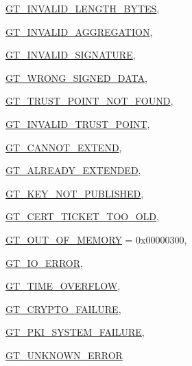\begin{DoxyCompactItemize}
\hyperlink{group__common_gga43b0c0f44bcf02caf0c2866b1f647a35a24646a453a06ef1ed86d0759b67e1d3b}{GT\_\-INVALID\_\-LENGTH\_\-BYTES}, 
\par
\hyperlink{group__common_gga43b0c0f44bcf02caf0c2866b1f647a35a90efaf44bf00c048dd3538275a51336b}{GT\_\-INVALID\_\-AGGREGATION}, 
\par
\hyperlink{group__common_gga43b0c0f44bcf02caf0c2866b1f647a35a7f5a3f747a5125746aea2ce58cd2a41f}{GT\_\-INVALID\_\-SIGNATURE}, 
\par
\hyperlink{group__common_gga43b0c0f44bcf02caf0c2866b1f647a35a7de160cd71ff92d4f28328adce57b170}{GT\_\-WRONG\_\-SIGNED\_\-DATA}, 
\par
\hyperlink{group__common_gga43b0c0f44bcf02caf0c2866b1f647a35a6467d3a62f48b44ff67d3850454a4945}{GT\_\-TRUST\_\-POINT\_\-NOT\_\-FOUND}, 
\par
\hyperlink{group__common_gga43b0c0f44bcf02caf0c2866b1f647a35aa34ec77610a50e78ea54e1e251770658}{GT\_\-INVALID\_\-TRUST\_\-POINT}, 
\par
\hyperlink{group__common_gga43b0c0f44bcf02caf0c2866b1f647a35af9092595593c2c1c4977e5b0b32b44db}{GT\_\-CANNOT\_\-EXTEND}, 
\par
\hyperlink{group__common_gga43b0c0f44bcf02caf0c2866b1f647a35abacb60fe077d53aef426c06cfb4117d8}{GT\_\-ALREADY\_\-EXTENDED}, 
\par
\hyperlink{group__common_gga43b0c0f44bcf02caf0c2866b1f647a35ab278b4e86a5ed73febecbf023f8831d8}{GT\_\-KEY\_\-NOT\_\-PUBLISHED}, 
\par
\hyperlink{group__common_gga43b0c0f44bcf02caf0c2866b1f647a35ab4b5f779174f4eb680a7158960f4d250}{GT\_\-CERT\_\-TICKET\_\-TOO\_\-OLD}, 
\par
\hyperlink{group__common_gga43b0c0f44bcf02caf0c2866b1f647a35ab91b6c5d5238ce4129c6e41d19758457}{GT\_\-OUT\_\-OF\_\-MEMORY} =  0x00000300, 
\par
\hyperlink{group__common_gga43b0c0f44bcf02caf0c2866b1f647a35a1f281f74b5939fbd94b240ffafdbd944}{GT\_\-IO\_\-ERROR}, 
\par
\hyperlink{group__common_gga43b0c0f44bcf02caf0c2866b1f647a35a0e71df3dbfd8410baa6a0b38dd793a24}{GT\_\-TIME\_\-OVERFLOW}, 
\par
\hyperlink{group__common_gga43b0c0f44bcf02caf0c2866b1f647a35af324e20163086132808eb36e860fbd53}{GT\_\-CRYPTO\_\-FAILURE}, 
\par
\hyperlink{group__common_gga43b0c0f44bcf02caf0c2866b1f647a35a82ab79e9424de4ed7368ef11ee0bb623}{GT\_\-PKI\_\-SYSTEM\_\-FAILURE}, 
\par
\hyperlink{group__common_gga43b0c0f44bcf02caf0c2866b1f647a35ae9da3f6482fc4fdaf6395bd3f6051714}{GT\_\-UNKNOWN\_\-ERROR}

\end{DoxyCompactItemize}
